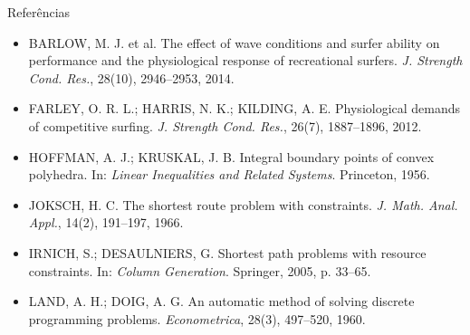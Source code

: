 \documentclass[aspectratio=169,10pt,xcolor=table]{beamer}
\begin{document}
\begin{frame}{Referências}
\scriptsize
\begin{itemize}
\setlength{\itemsep}{5pt}
\item BARLOW, M. J. et al. The effect of wave conditions and surfer ability on performance and the physiological response of recreational surfers. \emph{J. Strength Cond. Res.}, 28(10), 2946--2953, 2014.
\item FARLEY, O. R. L.; HARRIS, N. K.; KILDING, A. E. Physiological demands of competitive surfing. \emph{J. Strength Cond. Res.}, 26(7), 1887--1896, 2012.
\item HOFFMAN, A. J.; KRUSKAL, J. B. Integral boundary points of convex polyhedra. In: \emph{Linear Inequalities and Related Systems}. Princeton, 1956.
\item JOKSCH, H. C. The shortest route problem with constraints. \emph{J. Math. Anal. Appl.}, 14(2), 191--197, 1966.
\item IRNICH, S.; DESAULNIERS, G. Shortest path problems with resource constraints. In: \emph{Column Generation}. Springer, 2005, p. 33--65.
\item LAND, A. H.; DOIG, A. G. An automatic method of solving discrete programming problems. \emph{Econometrica}, 28(3), 497--520, 1960.
\end{itemize}
\end{frame}
\end{document}

